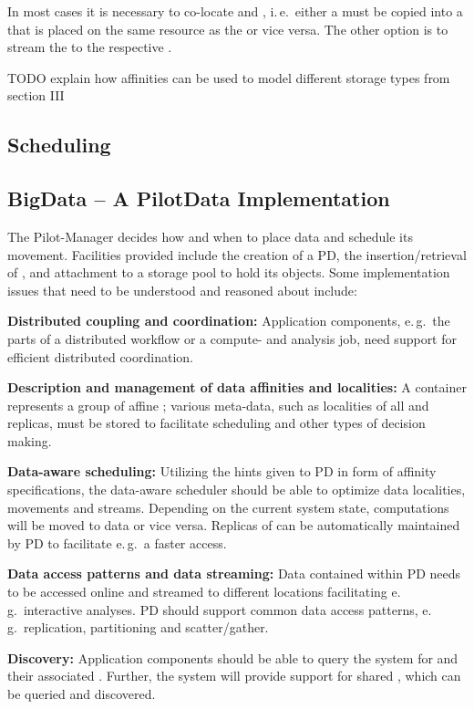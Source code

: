 \documentclass[conference]{IEEEtran}
\begin{document}
In most cases it is necessary to co-locate \cus and \dus, i.\,e.\ either a \du
must be copied into a \pd that is placed on the same resource as the \pj or
vice versa. The other option is to stream the \du to the respective \cu.

TODO
explain how affinities can be used to model different storage types from section III

\subsection{Scheduling}




\subsection{BigData -- A PilotData Implementation}


The Pilot-Manager decides how and when to place data and
schedule its movement. Facilities provided include the creation of a
PD, the insertion/retrieval of \dataunits, and attachment to a storage
pool to hold its objects. Some implementation issues that need to be
understood and reasoned about include:


\begin{compactitem}
\item \textbf{Distributed coupling and coordination:} Application
  components, e.\,g.\ the parts of a distributed workflow or a
  compute- and analysis job, need support for efficient distributed
  coordination.
\item \textbf{Description and management of data affinities and
    localities:} A \pd container represents a group of affine
  \dataunits; %
  various meta-data, such as localities of all \dataunits and
  replicas, must be stored to facilitate scheduling and other types of
  decision making.
\item \textbf{Data-aware scheduling:} Utilizing the hints given to PD
  in form of affinity specifications, the data-aware scheduler should
  be able to optimize data localities, movements and
  streams. Depending on the current system state, computations will be
  moved to data or vice versa. Replicas of \dataunits can be
  automatically maintained by PD to facilitate e.\,g.\ a faster
  access.
\item \textbf{Data access patterns and data streaming:} Data contained
  within PD needs to be accessed online and streamed to different
  locations facilitating e.\,g.\ interactive analyses.  PD should
  support common data access patterns, e.\,g.\ replication,
  partitioning and scatter/gather.
\item \textbf{Discovery:} Application components should be able to
  query the system for \dataunits and their associated
  \pilots. Further, the system will provide support for shared \dus,
  which can be queried and discovered.
\end{compactitem}
\end{document}
